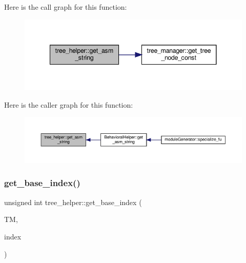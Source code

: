 Here is the call graph for this function\+:
\nopagebreak
\begin{figure}[H]
\begin{center}
\leavevmode
\includegraphics[width=341pt]{d7/d99/classtree__helper_a80a46c609e5a98a19534cf3b50f5fa3e_cgraph}
\end{center}
\end{figure}
Here is the caller graph for this function\+:
\nopagebreak
\begin{figure}[H]
\begin{center}
\leavevmode
\includegraphics[width=350pt]{d7/d99/classtree__helper_a80a46c609e5a98a19534cf3b50f5fa3e_icgraph}
\end{center}
\end{figure}
\mbox{\label{classtree__helper_a1f4f49f85ee4642ce275b23f29b252eb}} 
\subsubsection{\texorpdfstring{get\+\_\+base\+\_\+index()}{get\_base\_index()}}
{\footnotesize\ttfamily unsigned int tree\+\_\+helper\+::get\+\_\+base\+\_\+index (\begin{DoxyParamCaption}\item[{const \hyperlink{tree__manager_8hpp_a792e3f1f892d7d997a8d8a4a12e39346}{tree\+\_\+manager\+Const\+Ref} \&}]{TM,  }\item[{const unsigned int}]{index }\end{DoxyParamCaption})\hspace{0.3cm}{\ttfamily [static]}}



